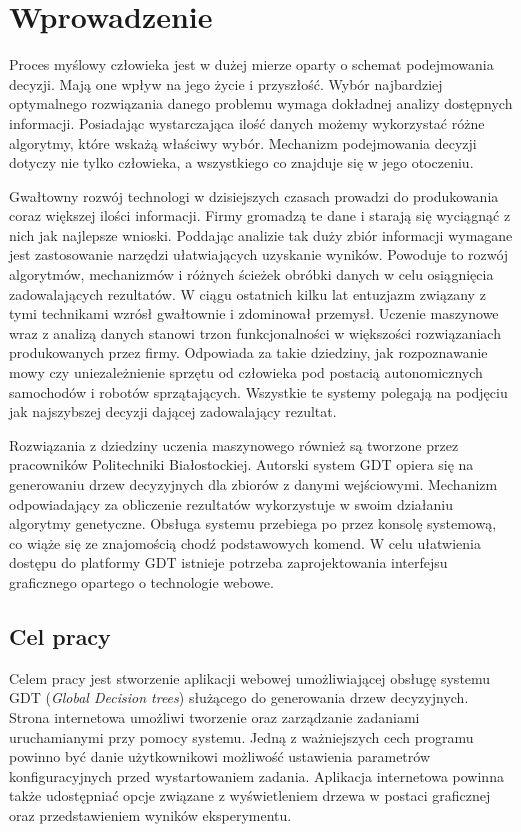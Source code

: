 \chapter*{Wprowadzenie}
Proces myślowy człowieka jest w dużej mierze oparty o schemat podejmowania decyzji. Mają one wpływ na jego życie i przyszłość. Wybór najbardziej optymalnego rozwiązania danego problemu wymaga dokładnej analizy dostępnych informacji. Posiadając wystarczająca ilość danych możemy wykorzystać różne algorytmy, które wskażą właściwy wybór. Mechanizm podejmowania decyzji dotyczy nie tylko człowieka, a wszystkiego co znajduje się w jego otoczeniu. 

Gwałtowny rozwój technologi w dzisiejszych czasach prowadzi do produkowania coraz większej ilości informacji. Firmy gromadzą te dane i starają się wyciągnąć z nich jak najlepsze wnioski. Poddając analizie tak duży zbiór informacji wymagane jest zastosowanie narzędzi ułatwiających uzyskanie wyników. Powoduje to rozwój algorytmów, mechanizmów i różnych ścieżek obróbki danych w celu osiągnięcia zadowalających rezultatów. W ciągu ostatnich kilku lat entuzjazm związany z tymi technikami wzrósł gwałtownie i zdominował przemysł. Uczenie maszynowe wraz z analizą danych stanowi trzon funkcjonalności w większości rozwiązaniach produkowanych przez firmy. Odpowiada za takie dziedziny, jak rozpoznawanie mowy czy uniezależnienie sprzętu od człowieka pod postacią autonomicznych samochodów i robotów sprzątających. Wszystkie te systemy polegają na podjęciu jak najszybszej decyzji dającej zadowalający rezultat. 

Rozwiązania z dziedziny uczenia maszynowego również są tworzone przez pracowników Politechniki Białostockiej. Autorski system GDT opiera się na generowaniu drzew decyzyjnych dla zbiorów z danymi wejściowymi. Mechanizm odpowiadający za obliczenie rezultatów wykorzystuje w swoim działaniu algorytmy genetyczne. Obsługa systemu przebiega po przez konsolę systemową, co wiąże się ze znajomością chodź podstawowych komend. W celu ułatwienia dostępu do platformy GDT istnieje potrzeba zaprojektowania interfejsu graficznego opartego o technologie webowe.  

\section*{Cel pracy}
Celem pracy jest stworzenie aplikacji webowej umożliwiającej obsługę systemu GDT (\textit{Global Decision trees}) służącego do generowania drzew decyzyjnych. Strona internetowa umożliwi tworzenie oraz zarządzanie zadaniami uruchamianymi przy pomocy systemu. Jedną z ważniejszych cech programu powinno być danie użytkownikowi możliwość ustawienia parametrów konfiguracyjnych przed wystartowaniem zadania. Aplikacja internetowa powinna także udostępniać opcje związane z wyświetleniem drzewa w postaci graficznej oraz przedstawieniem wyników eksperymentu.
